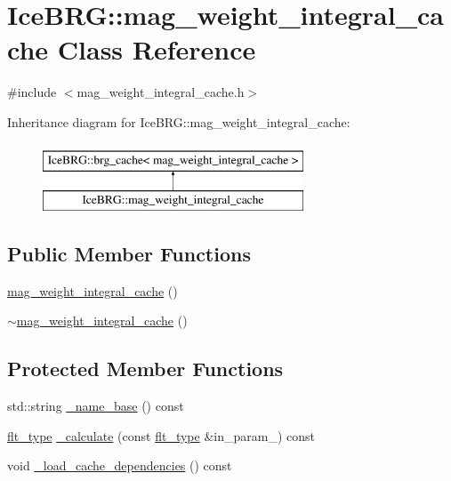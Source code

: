\hypertarget{classIceBRG_1_1mag__weight__integral__cache}{}\section{Ice\+B\+R\+G\+:\+:mag\+\_\+weight\+\_\+integral\+\_\+cache Class Reference}
\label{classIceBRG_1_1mag__weight__integral__cache}


{\ttfamily \#include $<$mag\+\_\+weight\+\_\+integral\+\_\+cache.\+h$>$}

Inheritance diagram for Ice\+B\+R\+G\+:\+:mag\+\_\+weight\+\_\+integral\+\_\+cache\+:\begin{figure}[H]
\begin{center}
\leavevmode
\includegraphics[height=2.000000cm]{classIceBRG_1_1mag__weight__integral__cache}
\end{center}
\end{figure}
\subsection*{Public Member Functions}
\begin{DoxyCompactItemize}
\item 
\hyperlink{classIceBRG_1_1mag__weight__integral__cache_ab891c0d594154de0145e41bc2c1b98f4}{mag\+\_\+weight\+\_\+integral\+\_\+cache} ()
\item 
\hyperlink{classIceBRG_1_1mag__weight__integral__cache_a743fcaa1cdbde9d28d19e0d916e49c8d}{$\sim$mag\+\_\+weight\+\_\+integral\+\_\+cache} ()
\end{DoxyCompactItemize}
\subsection*{Protected Member Functions}
\begin{DoxyCompactItemize}
\item 
std\+::string \hyperlink{classIceBRG_1_1mag__weight__integral__cache_aeab1aa78cf663d1e255fffb2746f1e79}{\+\_\+name\+\_\+base} () const 
\item 
\hyperlink{lib_2IceBRG__main_2common_8h_ad0f130a56eeb944d9ef2692ee881ecc4}{flt\+\_\+type} \hyperlink{classIceBRG_1_1mag__weight__integral__cache_a27435d81e53ee8cba625e76986e4da7b}{\+\_\+calculate} (const \hyperlink{lib_2IceBRG__main_2common_8h_ad0f130a56eeb944d9ef2692ee881ecc4}{flt\+\_\+type} \&in\+\_\+param\+\_) const 
\item 
void \hyperlink{classIceBRG_1_1mag__weight__integral__cache_a77b23616c7c1942f45998e4b016ef1f7}{\+\_\+load\+\_\+cache\+\_\+dependencies} () const 
\end{DoxyCompactItemize}
